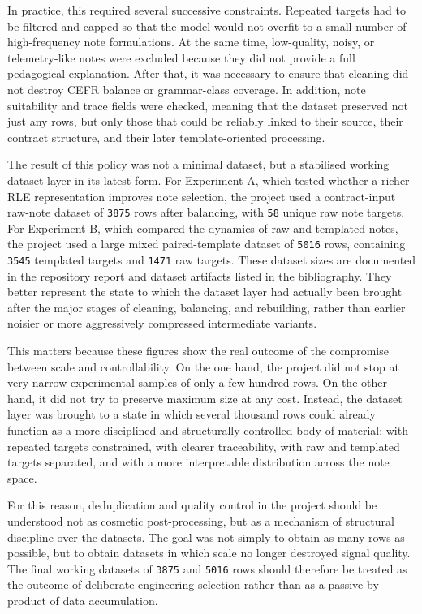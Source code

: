 \documentclass[12pt,a4paper,oneside]{report}
\begin{document}
In practice, this required several successive constraints. Repeated targets had to be filtered and capped so that the model would not overfit to a small number of high-frequency note formulations. At the same time, low-quality, noisy, or telemetry-like notes were excluded because they did not provide a full pedagogical explanation. After that, it was necessary to ensure that cleaning did not destroy CEFR balance or grammar-class coverage. In addition, note suitability and trace fields were checked, meaning that the dataset preserved not just any rows, but only those that could be reliably linked to their source, their contract structure, and their later template-oriented processing.

The result of this policy was not a minimal dataset, but a stabilised working dataset layer in its latest form. For Experiment A, which tested whether a richer RLE representation improves note selection, the project used a contract-input raw-note dataset of \texttt{3875} rows after balancing, with \texttt{58} unique raw note targets. For Experiment B, which compared the dynamics of raw and templated notes, the project used a large mixed paired-template dataset of \texttt{5016} rows, containing \texttt{3545} templated targets and \texttt{1471} raw targets. These dataset sizes are documented in the repository report and dataset artifacts listed in the bibliography. They better represent the state to which the dataset layer had actually been brought after the major stages of cleaning, balancing, and rebuilding, rather than earlier noisier or more aggressively compressed intermediate variants.

This matters because these figures show the real outcome of the compromise between scale and controllability. On the one hand, the project did not stop at very narrow experimental samples of only a few hundred rows. On the other hand, it did not try to preserve maximum size at any cost. Instead, the dataset layer was brought to a state in which several thousand rows could already function as a more disciplined and structurally controlled body of material: with repeated targets constrained, with clearer traceability, with raw and templated targets separated, and with a more interpretable distribution across the note space.

For this reason, deduplication and quality control in the project should be understood not as cosmetic post-processing, but as a mechanism of structural discipline over the datasets. The goal was not simply to obtain as many rows as possible, but to obtain datasets in which scale no longer destroyed signal quality. The final working datasets of \texttt{3875} and \texttt{5016} rows should therefore be treated as the outcome of deliberate engineering selection rather than as a passive by-product of data accumulation.
\end{document}
